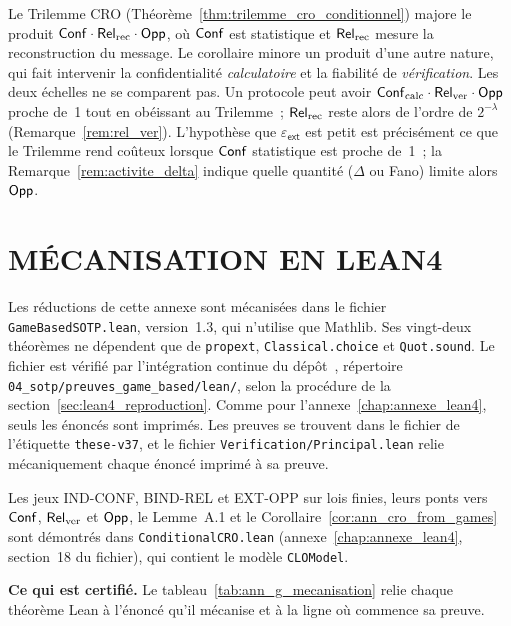 \begin{sloppypar}
\begin{remark}
\label{rem:ann_pas_de_contradiction}
Le Trilemme CRO (Th\'eor\`eme~\ref{thm:trilemme_cro_conditionnel}) majore le produit
$\mathsf{Conf}\cdot\mathsf{Rel}_{\mathrm{rec}}\cdot\mathsf{Opp}$, o\`u $\mathsf{Conf}$ est statistique et $\mathsf{Rel}_{\mathrm{rec}}$ mesure la
reconstruction du message. Le corollaire minore un produit d'une autre nature, qui fait intervenir la
confidentialit\'e \emph{calculatoire} et la fiabilit\'e de \emph{v\'erification}.
Les deux \'echelles ne se comparent pas. Un protocole peut avoir
$\mathsf{Conf}_{\mathrm{calc}}\cdot\mathsf{Rel}_{\mathrm{ver}}\cdot\mathsf{Opp}$ proche de~1 tout en ob\'eissant au
Trilemme~; $\mathsf{Rel}_{\mathrm{rec}}$ reste alors de l'ordre de $2^{-\lambda}$
(Remarque~\ref{rem:rel_ver}). L'hypoth\`ese que
$\varepsilon_{\mathsf{ext}}$ est petit est pr\'ecis\'ement ce que le Trilemme rend
co\^uteux lorsque $\mathsf{Conf}$ statistique est proche de~1~; la
Remarque~\ref{rem:activite_delta} indique quelle quantit\'e ($\Delta$ ou Fano) limite
alors $\mathsf{Opp}$. 
\end{remark}
\end{sloppypar}

\section{M\'ECANISATION EN LEAN4}
\label{sec:gamebased_mecanisation}
\begin{sloppypar}
Les r\'eductions de cette annexe sont m\'ecanis\'ees dans le fichier
\texttt{GameBasedSOTP.lean}, version~1.3, qui n'utilise que Mathlib. Ses vingt-deux
th\'eor\`emes ne d\'ependent que de \texttt{propext}, \texttt{Classical.choice} et
\texttt{Quot.sound}. Le fichier est v\'erifi\'e par l'int\'egration continue du
d\'ep\^ot~\cite{CROTrilemmaDepot}, r\'epertoire \texttt{04\_sotp/preuves\_game\_based/lean/},
selon la proc\'edure de la section~\ref{sec:lean4_reproduction}. Comme pour l'annexe~\ref{chap:annexe_lean4},
seuls les \'enonc\'es sont imprim\'es. Les preuves se trouvent dans le fichier de
l'\'etiquette \texttt{these-v37}, et le fichier \texttt{Verification/Principal.lean} relie
m\'ecaniquement chaque \'enonc\'e imprim\'e \`a sa preuve.

Les jeux IND-CONF, BIND-REL et EXT-OPP sur lois finies, leurs ponts vers $\mathsf{Conf}$,
$\mathsf{Rel}_{\mathrm{ver}}$ et $\mathsf{Opp}$, le Lemme~A.1 et le Corollaire~\ref{cor:ann_cro_from_games} sont
d\'emontr\'es dans \texttt{ConditionalCRO.lean} (annexe~\ref{chap:annexe_lean4}, section~18 du
fichier), qui contient le mod\`ele \texttt{CLOModel}.

\medskip
\noindent\textbf{Ce qui est certifi\'e.} Le tableau~\ref{tab:ann_g_mecanisation} relie
chaque th\'eor\`eme Lean \`a l'\'enonc\'e qu'il m\'ecanise et \`a la ligne o\`u commence sa preuve.
\end{sloppypar}

